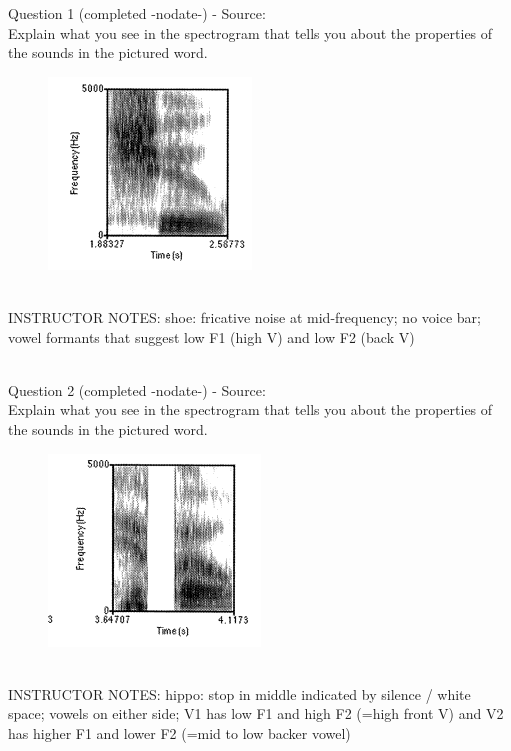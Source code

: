\documentclass[12pt]{article}
\begin{document}
{\large Question 1} (completed -nodate-) - Source: \\

Explain what you see in the spectrogram that tells you about the properties of the sounds in the pictured word.\\

\begin{figure}[H]
\includegraphics{../images/spectrogram_shoe.png}
\end{figure}

~\\
INSTRUCTOR NOTES: shoe: fricative noise at mid-frequency; no voice bar; vowel formants that suggest low F1 (high V) and low F2 (back V)


~\\

{\large Question 2} (completed -nodate-) - Source: \\

Explain what you see in the spectrogram that tells you about the properties of the sounds in the pictured word.\\

\begin{figure}[H]
\includegraphics{../images/spectrogram_hippo.png}
\end{figure}

~\\
INSTRUCTOR NOTES: hippo: stop in middle indicated by silence / white space; vowels on either side; V1 has low F1 and high F2 (=high front V) and V2 has higher F1 and lower F2 (=mid to low backer vowel)
\end{document}
